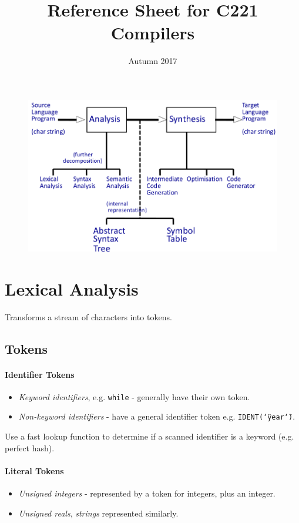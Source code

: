 \documentclass[twocolumn,english]{article}
\begin{document}
\title{Reference Sheet for C221 Compilers}

\date{Autumn 2017}

\maketitle
\begin{figure}[H]
\centering{}\includegraphics[width=0.7\linewidth]{img/compiler}
\end{figure}

\section{Lexical Analysis}

Transforms a stream of characters into tokens.

\subsection{Tokens}

\paragraph{Identifier Tokens}
\begin{itemize}
\item \emph{Keyword identifiers}, e.g. \texttt{while} - generally have their
own token.
\item \emph{Non-keyword identifiers} - have a general identifier token e.g.
\texttt{IDENT(\char`\"{}year\char`\"{})}.
\end{itemize}
Use a fast lookup function to determine if a scanned identifier is
a keyword (e.g. perfect hash).

\paragraph{Literal Tokens}
\begin{itemize}
\item \emph{Unsigned integers} - represented by a token for integers, plus
an integer.
\item \emph{Unsigned reals}, \emph{strings} represented similarly.
\end{itemize}
\end{document}
